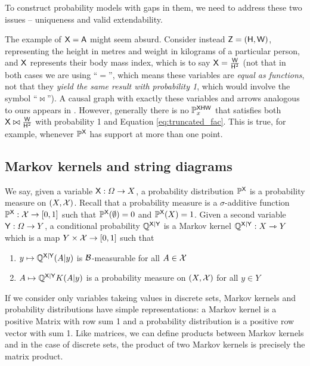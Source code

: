 To construct probability models with gaps in them, we need to address these two issues -- uniqueness and valid extendability.


The example of $\mathsf{X}=\mathsf{A}$ might seem absurd. Consider instead $\mathsf{Z}=(\mathsf{H},\mathsf{W})$, representing the height in metres and weight in kilograms of a particular person, and $\mathsf{X}$ represents their body mass index, which is to say $\mathsf{X}=\frac{\mathsf{W}}{\mathsf{H}^2}$ (not that in both cases we are using ``$=$'', which means these variables are \emph{equal as functions}, not that they \emph{yield the same result with probability 1}, which would involve the symbol ``$\bowtie$''). A causal graph with exactly these variables and arrows analogous to ours appears in \citet{shahar_association_2009}. However, generally there is no $\mathbb{P}_x^{\mathsf{XHW}}$ that satisfies both $\mathsf{X}\bowtie \frac{\mathsf{W}}{\mathsf{H}^2}$ with probability 1 and Equation \ref{eq:truncated_fac}. This is true, for example, whenever $\mathbb{P}^{\mathsf{X}}$ has support at more than one point.

\subsection{Markov kernels and string diagrams}

We say, given a variable $\mathsf{X}:\Omega\to X$, a probability distribution $\mathbb{P}^{\mathsf{X}}$ is a probability measure on $(X,\mathcal{X})$. Recall that a probability measure is a $\sigma$-additive function $\mathbb{P}^{\mathsf{X}}:\mathcal{X}\to [0,1]$ such that $\mathbb{P}^{\mathsf{X}}(\emptyset)=0$ and $\mathbb{P}^{\mathsf{X}}(X)=1$. Given a second variable $\mathsf{Y}:\Omega\to Y$, a conditional probability $\mathbb{Q}^{\mathsf{X}|\mathsf{Y}}$ is a Markov kernel $\mathbb{Q}^{\mathsf{X}|\mathsf{Y}}:X\rightarrowtriangle Y$which is a map $Y\times \mathcal{X}\to [0,1]$ such that

\begin{enumerate}
	\item $y\mapsto \mathbb{Q}^{\mathsf{X}|\mathsf{Y}}(A|y)$ is $\mathcal{B}$-measurable for all $A\in \mathcal{X}$
	\item $A\mapsto \mathbb{Q}^{\mathsf{X}|\mathsf{Y}}{K}(A|y)$ is a probability measure on $(X,\mathcal{X})$ for all $y\in Y$
\end{enumerate}

If we consider only variables takeing values in discrete sets, Markov kernels and probability distributions have simple representations: a Markov kernel is a positive Matrix with row sum 1 and a probability distribution is a positive row vector with sum 1. Like matrices, we can define products between Markov kernels and in the case of discrete sets, the product of two Markov kernels is precisely the matrix product.

